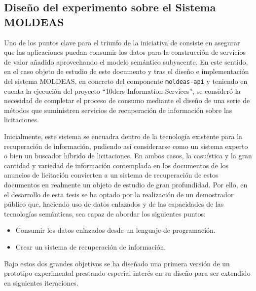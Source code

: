 \subsection{Diseño del experimento sobre el Sistema MOLDEAS}
Uno de los puntos clave para el triunfo de la iniciativa de \linkeddata consiste 
en asegurar que las aplicaciones puedan consumir los datos para la construcción de servicios 
de valor añadido aprovechando el modelo semántico subyacente. En este sentido, 
en el caso objeto de estudio de este documento y tras el diseño e implementación 
del sistema \gls{MOLDEAS}, en concreto del componente \texttt{moldeas-api} y teniendo 
en cuenta la ejecución del proyecto ``10ders Information Services'', se consideró 
la necesidad de completar el proceso de consumo mediante el diseño de 
una serie de métodos que suministren servicios de recuperación de información 
sobre las licitaciones.

Inicialmente, este sistema se encuadra dentro de la tecnología existente 
para la recuperación de información, pudiendo así considerarse como un sistema 
experto o bien un buscador híbrido de licitaciones. En ambos casos, la casuística 
y la gran cantidad y variedad de información contemplada en los documentos de los anuncios 
de licitación convierten a un sistema de recuperación de estos documentos en realmente 
un objeto de estudio de gran profundidad. Por ello, en el desarrollo de esta tesis 
se ha optado por la realización de un demostrador público que, haciendo uso 
de datos enlazados y de las capacidades de las tecnologías semánticas, sea capaz de 
abordar los siguientes puntos:
\begin{itemize}
 \item Consumir los datos enlazados desde un lenguaje de programación.
 \item Crear un sistema de recuperación de información.
\end{itemize}

Bajo estos dos grandes objetivos se ha diseñado una primera versión de un 
prototipo experimental prestando especial interés en su diseño para ser extendido 
en siguientes iteraciones.

